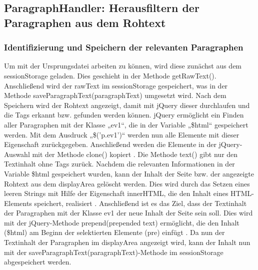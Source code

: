 \subsection{ParagraphHandler: Herausfiltern der Paragraphen aus dem Rohtext}

\subsubsection{Identifizierung und Speichern der relevanten Paragraphen}
Um mit der Ursprungsdatei arbeiten zu können, wird diese zunächst aus dem sessionStorage geladen. Dies geschieht in der Methode getRawText(). Anschließend wird der rawText im sessionStorage gespeichert, was in der Methode saveParagraphText(paragraphText) umgesetzt wird. Nach dem Speichern wird der Rohtext angezeigt, damit mit jQuery dieser durchlaufen und die Tags erkannt bzw. gefunden werden können. jQuery ermöglicht ein Finden aller Paragraphen mit der Klasse „ev1“, die in der Variable „\$html“ gespeichert werden. Mit dem Ausdruck „\$('p.ev1')“ werden nun alle Elemente mit dieser Eigenschaft zurückgegeben. Anschließend werden die Elemente in der jQuery-Auswahl mit der Methode clone() kopiert \cite{clone}. Die Methode text() gibt nur den Textinhalt ohne Tags zurück. Nachdem die relevanten Informationen in der Variable \$html gespeichert wurden, kann der Inhalt der Seite bzw. der angezeigte Rohtext aus dem displayArea gelöscht werden. Dies wird durch das Setzen eines leeren Strings mit Hilfe der Eigenschaft innerHTML, die den Inhalt eines HTML-Elements speichert, realisiert \cite{innerhtml}. Anschließend ist es das Ziel, dass der Textinhalt der Paragraphen mit der Klasse ev1 der neue Inhalt der Seite sein soll. Dies wird mit der jQuery-Methode prepend(prepended text) ermöglicht, die den Inhalt (\$html) am Beginn der selektierten Elemente (pre) einfügt \cite{prepend}. Da nun der Textinhalt der Paragraphen im displayArea angezeigt wird, kann der Inhalt nun mit der saveParagraphText(paragraphText)-Methode im sessionStorage abgespeichert werden.

